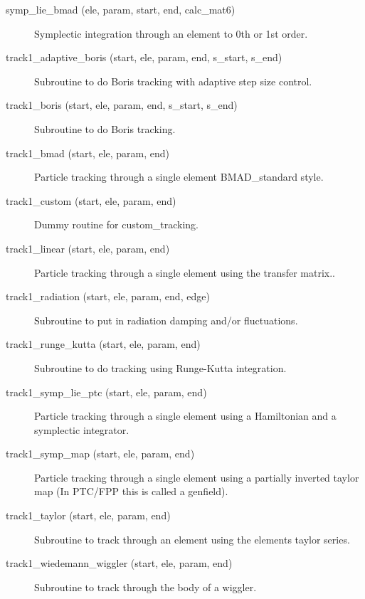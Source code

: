 \begin{description}

\item[symp_lie_bmad (ele, param, start, end, calc_mat6)] \Newline
Symplectic integration through an element to 0th or 1st order.

\item[track1_adaptive_boris (start, ele, param, end, s_start, s_end)] \Newline
Subroutine to do Boris tracking with adaptive step size control. 

\item[track1_boris (start, ele, param, end, s_start, s_end)] \Newline
Subroutine to do Boris tracking.  

\item[track1_bmad (start, ele, param, end)] \Newline
Particle tracking through a single element BMAD_standard style. 

\item[track1_custom (start, ele, param, end)] \Newline
Dummy routine for custom_tracking.

\item[track1_linear (start, ele, param, end)] \Newline
Particle tracking through a single element using the transfer matrix.. 

\item[track1_radiation (start, ele, param, end, edge)] \Newline
Subroutine to put in radiation damping and/or fluctuations. 

\item[track1_runge_kutta (start, ele, param, end)] \Newline
Subroutine to do tracking using Runge-Kutta integration. 

\item[track1_symp_lie_ptc (start, ele, param, end)] \Newline
Particle tracking through a single element using a Hamiltonian and a 
symplectic integrator. 

\item[track1_symp_map (start, ele, param, end)] \Newline
Particle tracking through a single element using a partially inverted 
taylor map (In PTC/FPP this is called a genfield). 

\item[track1_taylor (start, ele, param, end)] \Newline
Subroutine to track through an element using the elements taylor series. 

\item[track1_wiedemann_wiggler (start, ele, param, end)] \Newline
Subroutine to track through the body of a wiggler. 

\end{description}

